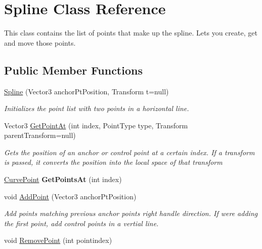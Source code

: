 \hypertarget{class_spline}{}\section{Spline Class Reference}
\label{class_spline}


This class contains the list of points that make up the spline. Lets you create, get and move those points.  


\subsection*{Public Member Functions}
\begin{DoxyCompactItemize}
\item 
\mbox{\hyperlink{class_spline_ad81797f1f2c52c431f16c75f53370175}{Spline}} (Vector3 anchor\+Pt\+Position, Transform t=null)
\begin{DoxyCompactList}\small\item\em Initializes the point list with two points in a horizontal line. \end{DoxyCompactList}\item 
Vector3 \mbox{\hyperlink{class_spline_a38bbded272df2a9943a90dc33f7c9042}{Get\+Point\+At}} (int index, Point\+Type type, Transform parent\+Transform=null)
\begin{DoxyCompactList}\small\item\em Gets the position of an anchor or control point at a certain index. If a transform is passed, it converts the position into the local space of that transform \end{DoxyCompactList}\item 
\mbox{\label{class_spline_a59de318e7ed75528fad1e0e20d476a1a}} 
\mbox{\hyperlink{class_curve_point}{Curve\+Point}} {\bfseries Get\+Points\+At} (int index)
\item 
void \mbox{\hyperlink{class_spline_a57e6ce88b2b1d1362651dff09b6ef2c8}{Add\+Point}} (Vector3 anchor\+Pt\+Position)
\begin{DoxyCompactList}\small\item\em Add points matching previous anchor point\textquotesingle{}s right handle direction. If we\textquotesingle{}re adding the first point, add control points in a vertial line. \end{DoxyCompactList}\item 
void \mbox{\hyperlink{class_spline_a045ca3ecc4c7e42c054150204833a40c}{Remove\+Point}} (int pointindex)

\end{DoxyCompactItemize}
